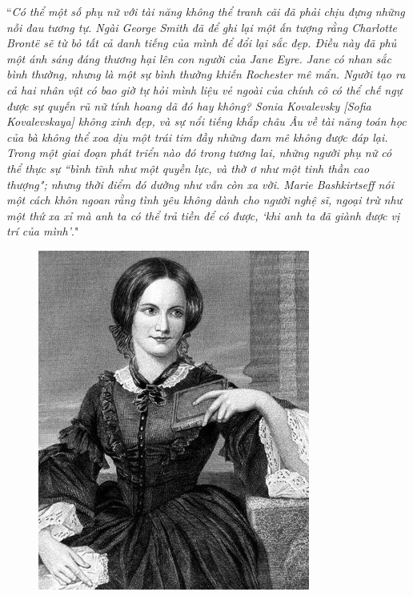\begin{multicols}{2}
\begin{figure}[H]
		\vspace*{-5pt}
	\end{figure}
	``\textit{Có thể một số phụ nữ với tài năng không thể tranh cãi đã phải chịu đựng những nỗi đau tương tự. Ngài George Smith đã để ghi lại một ấn tượng rằng Charlotte Brontë sẽ từ bỏ tất cả danh tiếng của mình để đổi lại sắc đẹp. Điều này đã phủ một ánh sáng đáng thương hại lên con người của Jane Eyre. Jane có nhan sắc bình thường, nhưng là một sự bình thường khiến Rochester mê mẩn. Người tạo ra cả hai nhân vật có bao giờ tự hỏi mình liệu vẻ ngoài của chính cô  có thể chế ngự được sự quyến rũ nữ tính hoang dã đó  hay không? Sonia Kovalevsky [Sofia Kovalevskaya] không xinh đẹp, và sự nổi tiếng khắp châu Âu về tài năng toán học của bà không thể xoa dịu một trái tim đầy những đam mê không được đáp lại. Trong một giai đoạn phát triển nào đó trong tương lai, những người phụ nữ có thể thực sự ``bình tĩnh như một quyền lực, và thờ ơ như một tinh thần cao thượng"; nhưng thời điểm đó dường như vẫn còn xa vời. Marie Bashkirtseff nói một cách khôn ngoan rằng tình yêu không dành cho người nghệ sĩ, ngoại trừ như một thứ xa xỉ mà anh ta có thể trả tiền để có được, `khi anh ta đã giành được vị trí của mình'}."
	\begin{figure}[H]
		\vspace*{-5pt}
		\centering
		\captionsetup{labelformat= empty, justification=centering}
		\includegraphics[width= 0.75\linewidth]{2}

\end{figure}
\end{multicols}
